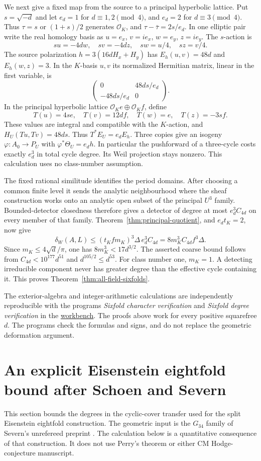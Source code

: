 \documentclass[11pt]{article}
\theoremstyle{definition}
\theoremstyle{remark}
\newcommand{\workbenchurl}{https://github.com/KokunoYumeto/algebraic-cycles-and-motives-workbench}
\begin{document}
We next give a fixed map from the source to a principal hyperbolic lattice. Put $s=\sqrt{-d}$ and let $e_d=1$ for $d\equiv1,2\pmod4$, and $e_d=2$ for $d\equiv3\pmod4$. Thus $\tau=s$ or $(1+s)/2$ generates $\mathcal O_K$, and $\tau-\bar\tau=2s/e_d$. In one elliptic pair write the real homology basis as $u=e_x$, $v=i e_x$, $w=e_y$, $z=i e_y$. The $s$-action is
\[
 su=-4dw,\quad sv=-4dz,\quad sw=u/4,\quad sz=v/4.
\]
The source polarization $h=3(16dH_x+H_y)$ has $E_h(u,v)=48d$ and $E_h(w,z)=3$. In the $K$-basis $u,v$ its normalized Hermitian matrix, linear in the first variable, is
\[
 \begin{pmatrix}0&48ds/e_d\\-48ds/e_d&0\end{pmatrix}.
\]
In the principal hyperbolic lattice $\mathcal O_K e\oplus\mathcal O_K f$, define
\[
 T(u)=4s e,\quad T(v)=12d f,\quad
 T(w)=e,\quad T(z)=-3s f.
\]
These values are integral and compatible with the $K$-action, and $H_U(Tu,Tv)=48ds$. Thus $T^*E_U=e_dE_h$. Three copies give an isogeny $\varphi:A_0\to P_U$ with $\varphi^*\Theta_U=e_dh$. In particular the pushforward of a three-cycle costs exactly $e_d^3$ in total cycle degree. Its Weil projection stays nonzero. This calculation uses no class-number assumption.

The fixed rational similitude identifies the period domains. After choosing a common finite level it sends the analytic neighbourhood where the sheaf construction works onto an analytic open subset of the principal $U^3$ family. Bounded-detector closedness therefore gives a detector of degree at most $e_d^3C_{4d}$ on every member of that family. Theorem~\ref{thm:principal-quotient}, and $e_dt_K=2$, now give
\[
 \delta_W(A,L)\le(t_Kfm_K)^3\Delta\,e_d^3C_{4d}
                 =8m_K^3C_{4d}f^3\Delta.
\]
Since $m_K\le4\sqrt d/\pi$, one has $8m_K^3<17d^{3/2}$. The asserted coarse bound follows from $C_{4d}<10^{177}d^{51}$ and $d^{105/2}\le d^{53}$. For class number one, $m_K=1$. A detecting irreducible component never has greater degree than the effective cycle containing it. This proves Theorem~\ref{thm:all-field-sixfolds}.

The exterior-algebra and integer-arithmetic calculations are independently reproducible with the programs \emph{Sixfold character verification} and \emph{Sixfold degree verification} in the \href{\workbenchurl}{workbench}. The proofs above work for every positive squarefree $d$. The programs check the formulas and signs, and do not replace the geometric deformation argument.
\section{An explicit Eisenstein eightfold bound after Schoen and Severn}
\label{sec:eisenstein-eightfolds}
This section bounds the degrees in the cyclic-cover transfer used for the
split Eisenstein eightfold construction. The geometric input is the
$G_{34}$ family of Severn's unrefereed preprint
\cite[Proposition~8.5, \S9 and Appendix~A]{Severn}. The calculation below
is a quantitative consequence of that construction. It does not use
Perry's theorem or either CM Hodge-conjecture manuscript.
\end{document}
